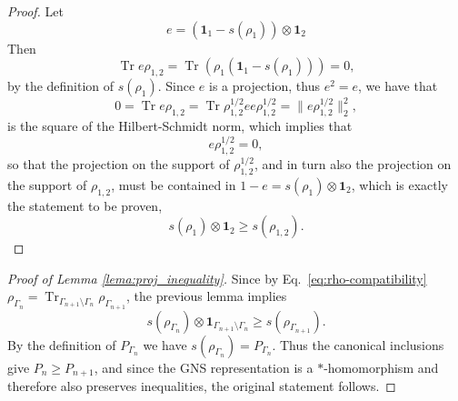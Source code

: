 \documentclass[aps,pra,reprint,superscriptaddress]{revtex4-2}
\newcommand\G{\Gamma}
\renewcommand\r{\rho}
\newcommand{\id}{\mathbf 1}
\providecommand{\Tr}{\operatorname{Tr}}
\providecommand{\norm}[1]{\lVert #1\rVert}
\theoremstyle{definition}
\theoremstyle{remark}
\begin{document}
\begin{proof}
    Let 
    \begin{equation}
        e = (\id_1 - s(\r_1)) \otimes \id_2
    \end{equation}
    Then
    \begin{equation}
        \Tr e \r_{1,2} = \Tr (\r_1 (\id_1 - s(\r_1))) = 0,
    \end{equation}
    by the definition of $s(\r_1)$. Since $e$ is a projection, thus $e^2 = e$, we have that
    \begin{equation}
        0 = \Tr e \r_{1,2} = \Tr \r^{1/2}_{1,2} e e \r^{1/2}_{1,2} = \norm{e
        \r^{1/2}_{1,2}}^{2}_2,
    \end{equation}
    is the square of the Hilbert-Schmidt norm, which implies that 
    \begin{equation}
        e\r^{1/2}_{1,2} = 0,
    \end{equation}
    so that the projection on the support of $\r^{1/2}_{1,2}$, and in turn also the projection on the support of
    $\r_{1,2}$, must be contained in $1-e =s(\r_1) \otimes \id_2$, which is
    exactly the statement to be proven,
    \begin{equation}
        s(\r_1) \otimes \id_2 \geq s(\r_{1,2}).
    \end{equation}
\end{proof}

\begin{proof}[Proof of Lemma \ref{lema:proj_inequality}]
    Since by Eq.~\eqref{eq:rho-compatibility} $\r_{\G_n} = \Tr_{\G_{n+1} \setminus \G_{n}} \r_{\G_{n+1}}$, the previous lemma implies
    \begin{equation}
        s(\r_{\G_n}) \otimes \id_{\G_{n+1} \setminus \G_{n}} \geq s(\r_{\G_{n+1}}).
    \end{equation}
    By the definition of $P_{\G_n}$ we have $s(\r_{\G_n})=P_{\G_n}$. Thus the canonical inclusions give
    $P_n \geq P_{n+1}$, and since
    the GNS representation is a $\ast$-homomorphism and therefore also preserves
    inequalities, the original statement follows.
\end{proof}
\end{document}

